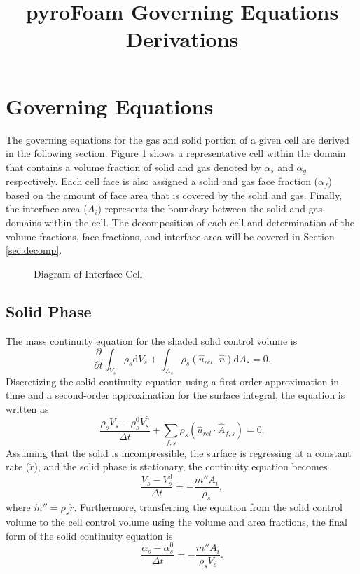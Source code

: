 \documentclass{article}
\title{pyroFoam Governing Equations Derivations}
\renewcommand{\vec}[1]{\ensuremath{\hat{#1}}}
\renewcommand{\d}{\mathrm{d}}
\begin{document}
  \section{Governing Equations}
    The governing equations for the gas and solid portion of a given cell are derived in the following section.
    Figure \ref{fig:VOF} shows a representative cell within the domain that contains a volume fraction of solid and gas denoted by $\alpha_s$ and $\alpha_g$ respectively.
    Each cell face is also assigned a solid and gas face fraction ($\alpha_f$) based on the amount of face area that is covered by the solid and gas.
    Finally, the interface area ($A_i$) represents the boundary between the solid and gas domains within the cell.
    The decomposition of each cell and determination of the volume fractions, face fractions, and interface area will be covered in Section \ref{sec:decomp}.

    \begin{figure}
      \centering
      \label{fig:VOF}
      \def\svgwidth{0.5\textwidth}
      
      \caption{Diagram of Interface Cell}
    \end{figure}

    \subsection{Solid Phase}
      The mass continuity equation for the shaded solid control volume is
      \begin{equation*}
          \frac{\partial}{\partial t}\int_{V_s} \rho_s \d V_s
        + \int_{A_s} \rho_s (\vec{u}_{rel} \cdot \vec{n}) \d A_s
        = 0.
      \end{equation*}
      Discretizing the solid continuity equation using a first-order approximation in time and a second-order approximation for the surface integral, the equation is written as
      \begin{equation*}
          \frac{\rho_s V_s - \rho_s^0 V_s^0}{\Delta t}
        + \sum_{f,s}\rho_s(\vec{u}_{rel}\cdot\vec{A}_{f,s})
        = 0.
      \end{equation*}
      Assuming that the solid is incompressible, the surface is regressing at a constant rate ($\dot{r}$), and the solid phase is stationary, the continuity equation becomes
      \begin{equation*}
          \frac{V_s - V_s^0}{\Delta t}
        = -\frac{\dot{m}'' A_i}{\rho_s},
      \end{equation*}
      where $\dot{m}'' = \rho_s \dot{r}$.
      Furthermore, transferring the equation from the solid control volume to the cell control volume using the volume and area fractions, the final form of the solid continuity equation is
      \begin{equation}
        \label{eq:solidContinuity}
          \frac{\alpha_s - \alpha_s^0}{\Delta t}
        = -\frac{\dot{m}'' A_i}{\rho_s V_c}.
      \end{equation}
\end{document}
